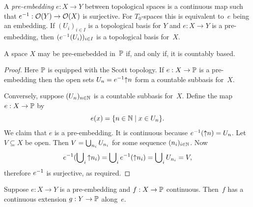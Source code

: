 A \emph{pre-embedding} $e : X \to Y$ between topological spaces is a
continuous map such that ${e}^{-1} : \mathcal{O}(Y) \to \mathcal{O}(X)$ is
surjective. For $T_0$-spaces this is equivalent to~$e$ being an
embedding. If $(U_i)_{i \in I}$ is a topological basis for $Y$ and $e
: X \to Y$ is a pre-embedding, then $({e}^{-1}(U_i))_{i \in I}$ is a
topological basis for~$X$.

\begin{theorem}
  \label{thm:scott-embedding}%
  A space $X$ may be pre-emebedded in~$\mathbb{P}$ if, and only if, it is
  countably based.
\end{theorem}

\begin{proof}
  Here $\mathbb{P}$ is equipped with the Scott topology. If $e : X \to
  \mathbb{P}$ is a pre-embedding then the open sets $U_n =
  {e}^{-1}{{\uparrow}n}$ form a countable subbasis for~$X$.

  Conversely, suppose $(U_n)_{n \in \mathbb{N}}$ is a countable subbasis
  for~$X$. Define the map $e : X \to \mathbb{P}$ by
  \begin{equation*}
    e(x) = \{n \in \mathbb{N} \mid x \in U_n\}.
  \end{equation*}
  We claim that $e$ is a pre-embedding. It is continuous because
  ${e}^{-1}({\uparrow}n) = U_n$. Let $V \subseteq X$ be open. Then $V =
  \bigcup\nolimits_{n_i} U_{n_i}$ for some sequence $(n_i)_{i \in \mathbb{N}}$. Now
  \begin{equation*}
    {e}^{-1}(\bigcup\nolimits_i {\uparrow}n_i) =
      \bigcup\nolimits_i {e}^{-1}({\uparrow}n_i) =
      \bigcup\nolimits_i U_{n_i} = V,
  \end{equation*}
  therefore ${e}^{-1}$ is surjective, as required.
\end{proof}

\begin{theorem}
  \label{thm:scott-extension}%
  Suppose $e : X \to Y$ is a pre-embedding and $f : X \to \mathbb{P}$
  continuous. Then~$f$ has a continuous extension $g : Y \to \mathbb{P}$
  along~$e$.
\end{theorem}


